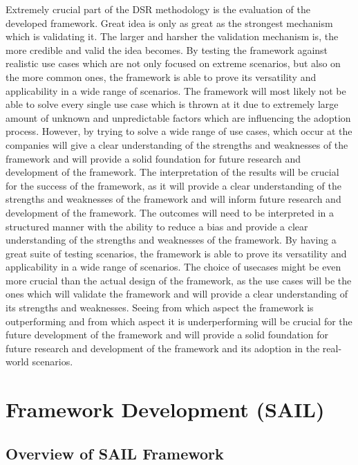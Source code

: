 \documentclass[]{imc-inf}
\begin{document}
Extremely crucial part of the DSR methodology is the evaluation of the
developed framework. Great idea is only as great as the strongest
mechanism which is validating it. The larger and harsher the validation
mechanism is, the more credible and valid the idea becomes. By testing
the framework against realistic use cases which are not only focused on
extreme scenarios, but also on the more common ones, the framework is
able to prove its versatility and applicability in a wide range of
scenarios. The framework will most likely not be able to solve every
single use case which is thrown at it due to extremely large amount of
unknown and unpredictable factors which are influencing the adoption
process. However, by trying to solve a wide range of use cases, which
occur at the companies will give a clear understanding of the strengths
and weaknesses of the framework and will provide a solid foundation for
future research and development of the framework. The interpretation of
the results will be crucial for the success of the framework, as it will
provide a clear understanding of the strengths and weaknesses of the
framework and will inform future research and development of the
framework. The outcomes will need to be interpreted in a structured
manner with the ability to reduce a bias and provide a clear
understanding of the strengths and weaknesses of the framework. By
having a great suite of testing scenarios, the framework is able to
prove its versatility and applicability in a wide range of scenarios.
The choice of usecases might be even more crucial than the actual design
of the framework, as the use cases will be the ones which will validate
the framework and will provide a clear understanding of its strengths
and weaknesses. Seeing from which aspect the framework is outperforming
and from which aspect it is underperforming will be crucial for the
future development of the framework and will provide a solid foundation
for future research and development of the framework and its adoption in
the real-world scenarios.

\chapter{Framework Development
	(SAIL)}\label{framework-development-sail}

\section{Overview of SAIL Framework}\label{overview-of-sail-framework}
\end{document}
